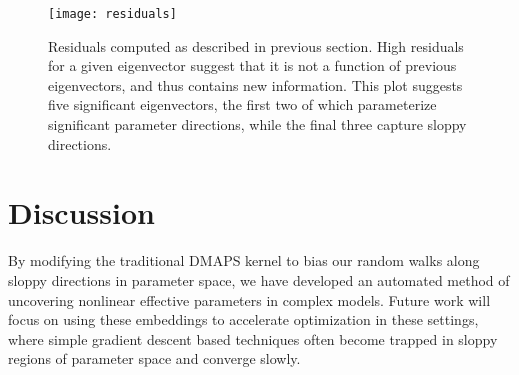 \begin{figure}
  \centering
  \texttt{[image: residuals]}
  \caption[Plot of DMAPS residuals showing which eigenvectors are
  independent]{Residuals computed as described in previous
    section. High residuals for a given eigenvector suggest that it is
    not a function of previous eigenvectors, and thus contains new
    information. This plot suggests five significant eigenvectors, the
    first two of which parameterize significant parameter directions,
    while the final three capture sloppy
    directions. \label{fig:resids} }
\end{figure}


\section{Discussion}

By modifying the traditional DMAPS kernel to bias our random walks
along sloppy directions in parameter space, we have developed an
automated method of uncovering nonlinear effective parameters in
complex models. Future work will focus on using these embeddings to
accelerate optimization in these settings, where simple gradient
descent based techniques often become trapped in sloppy regions of
parameter space and converge slowly.

